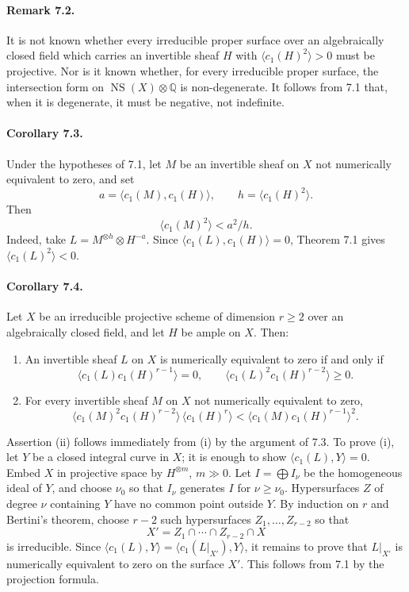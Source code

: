 \documentclass[12pt]{article}
\newcommand{\QQ}{\mathbb Q}
\newcommand{\NS}{\operatorname{NS}}
\begin{document}
\paragraph{Remark 7.2.}
It is not known whether every irreducible proper surface over an algebraically closed field which carries an invertible sheaf $H$ with $\langle c_1(H)^2\rangle>0$ must be projective. Nor is it known whether, for every irreducible proper surface, the intersection form on $\NS(X)\otimes\QQ$ is non-degenerate. It follows from 7.1 that, when it is degenerate, it must be negative, not indefinite.

\paragraph{Corollary 7.3.}
Under the hypotheses of 7.1, let $M$ be an invertible sheaf on $X$ not numerically equivalent to zero, and set
\[
a=\langle c_1(M),c_1(H)\rangle,\qquad h=\langle c_1(H)^2\rangle.
\]
Then
\[
\langle c_1(M)^2\rangle < a^2/h.
\]
Indeed, take $L=M^{\otimes h}\otimes H^{-a}$. Since $\langle c_1(L),c_1(H)\rangle=0$, Theorem 7.1 gives $\langle c_1(L)^2\rangle<0$.

\paragraph{Corollary 7.4.}
Let $X$ be an irreducible projective scheme of dimension $r\geq2$ over an algebraically closed field, and let $H$ be ample on $X$. Then:
\begin{enumerate}[label=\roman*)]
\item An invertible sheaf $L$ on $X$ is numerically equivalent to zero if and only if
\[
\langle c_1(L)c_1(H)^{r-1}\rangle=0,\qquad
\langle c_1(L)^2c_1(H)^{r-2}\rangle\geq0.
\]
\item For every invertible sheaf $M$ on $X$ not numerically equivalent to zero,
\[
\langle c_1(M)^2c_1(H)^{r-2}\rangle\,
\langle c_1(H)^r\rangle
<
\langle c_1(M)c_1(H)^{r-1}\rangle^2.
\]
\end{enumerate}

Assertion (ii) follows immediately from (i) by the argument of 7.3. To prove (i), let $Y$ be a closed integral curve in $X$; it is enough to show $\langle c_1(L),Y\rangle=0$. Embed $X$ in projective space by $H^{\otimes m}$, $m\gg0$. Let $I=\bigoplus I_\nu$ be the homogeneous ideal of $Y$, and choose $\nu_0$ so that $I_\nu$ generates $I$ for $\nu\geq\nu_0$. Hypersurfaces $Z$ of degree $\nu$ containing $Y$ have no common point outside $Y$. By induction on $r$ and Bertini's theorem, choose $r-2$ such hypersurfaces $Z_1,\ldots,Z_{r-2}$ so that
\[
X'=Z_1\cap\cdots\cap Z_{r-2}\cap X
\]
is irreducible. Since $\langle c_1(L),Y\rangle=\langle c_1(L|_{X'}),Y\rangle$, it remains to prove that $L|_{X'}$ is numerically equivalent to zero on the surface $X'$. This follows from 7.1 by the projection formula.
\end{document}
